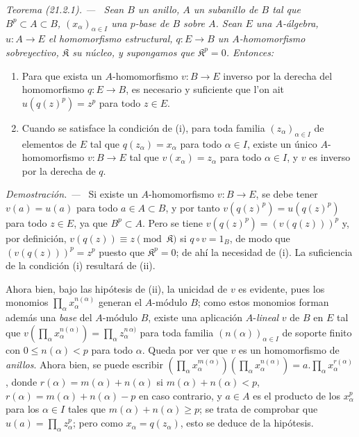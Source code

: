 \documentclass[10pt,oneside]{book}
\makeatletter
\newcommand{\setmanualcurrentlabel}[1]{\def\@currentlabel{#1}}
\newcommand{\oldpage}[2][]{%
  \setcounter{footnote}{0}%
  \marginpar{\scriptsize\textbf{#1}~|~#2}\ignorespaces}
\newenvironment{theorem}[1][]{%
  \setmanualcurrentlabel{#1}\par\medskip\noindent\itshape Teorema (#1). ---\ }{\par}
\newenvironment{proof}{%
  \par\medskip\noindent\textit{Demostración. ---\ }}{\par}
\providecommand{\setmin}{-}%
\makeatother
\begin{document}
\begin{theorem}[21.2.1]
\label{0.21.2.1-es}
Sean $B$ un anillo, $A$ un subanillo de $B$ tal que $B^p\subset A\subset B$,
$(x_\alpha)_{\alpha\in I}$ una $p$-base de $B$ sobre $A$.
Sean $E$ una $A$-álgebra, $u:A\to E$ el homomorfismo estructural,
$q:E\to B$ un $A$-homomorfismo sobreyectivo, $\mathfrak K$ su núcleo, y
supongamos que $\mathfrak K^p=0$. Entonces:
\begin{enumerate}
  \item[\textup{(i)}] Para que exista un $A$-homomorfismo $v:B\to E$ inverso por la
  derecha del homomorfismo $q:E\to B$, es necesario y suficiente que l'on ait
  $u(q(z)^p)=z^p$ para todo $z\in E$.
  \item[\textup{(ii)}] Cuando se satisface la condición de \textup{(i)}, para toda familia
  $(z_\alpha)_{\alpha\in I}$ de elementos de $E$ tal que
  $q(z_\alpha)=x_\alpha$ para todo $\alpha\in I$, existe un único
  $A$-homomorfismo $v:B\to E$ tal que $v(x_\alpha)=z_\alpha$ para todo
  $\alpha\in I$, y $v$ es inverso por la derecha de $q$.
\end{enumerate}
\end{theorem}

\begin{proof}
Si existe un $A$-homomorfismo $v:B\to E$, se debe tener $v(a)=u(a)$ para
todo $a\in A\subset B$, y por tanto $v(q(z)^p)=u(q(z)^p)$ para todo $z\in E$,
ya que $B^p\subset A$. Pero se tiene $v(q(z)^p)=(v(q(z)))^p$ y, por definición,
$v(q(z))\equiv z\pmod{\mathfrak K}$ si $q\circ v=1_B$, de modo que
$(v(q(z)))^p=z^p$ puesto que $\mathfrak K^p=0$; de ahí la necesidad de (i).
La suficiencia de la condición (i) resultará de (ii).

Ahora bien, bajo las hipótesis de (ii), la unicidad de $v$ es evidente, pues
los monomios $\prod_\alpha x_\alpha^{n(\alpha)}$ generan el $A$-módulo $B$;
como estos monomios forman además una \emph{base} del $A$-módulo $B$, existe
una aplicación $A$-\emph{lineal} $v$ de $B$ en $E$ tal que
$v(\prod_\alpha x_\alpha^{n(\alpha)})=\prod_\alpha z_\alpha^{n\,\alpha)}$
para toda familia $(n(\alpha))_{\alpha\in I}$ de soporte finito con
$0\leq n(\alpha)<p$ para todo $\alpha$. Queda por ver que $v$ es un
homomorfismo de \emph{anillos}. Ahora bien, se puede escribir
$(\prod_\alpha x_\alpha^{m(\alpha)})(\prod_\alpha x_\alpha^{n(\alpha)})
=a.\prod_\alpha x_\alpha^{r(\alpha)}$, donde
$r(\alpha)=m(\alpha)+n(\alpha)$ si $m(\alpha)+n(\alpha)<p$,
$r(\alpha)=m(\alpha)+n(\alpha)\setmin p$ en caso contrario, y $a\in A$
\oldpage[0\textsubscript{IV-1}]{158}
es el producto de los $x_\alpha^p$ para los $\alpha\in I$ tales que
$m(\alpha)+n(\alpha)\geq p$; se trata de comprobar que
$u(a)=\prod_\alpha z_\alpha^p$; pero como $x_\alpha=q(z_\alpha)$, esto se
deduce de la hipótesis.
\end{proof}
\end{document}
